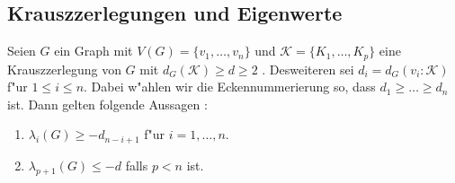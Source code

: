 \subsection{Krauszzerlegungen und Eigenwerte}

\begin{theorem}
  \label{thm:KrauszEigenwerte}
  Seien $G$ ein Graph mit $V(G)=\{v_1,\dots,v_n\}$ und $\mathcal K=\{K_1,\dots,K_p\}$ eine Krauszzerlegung von $G$ mit $d_G(\mathcal K) \geq d \geq 2$ . Desweiteren sei $d_i = d_G(v_{i}:\mathcal K)$ f"ur $1\leq i \leq n$. 
  Dabei w"ahlen wir die Eckennummerierung so, dass $d_1 \geq \dots \geq d_{n}$ ist.
  Dann gelten folgende Aussagen : 
  \begin{enumerate}[label=\rm{(\alph*)}]
    \item $\lambda_i(G) \geq -d_{n-i+1}$ f"ur $i = 1, \dots , n$.
    \item $\lambda_{p+1}(G) \leq -d$ falls $p < n$ ist.
  \end{enumerate}
\end{theorem}
